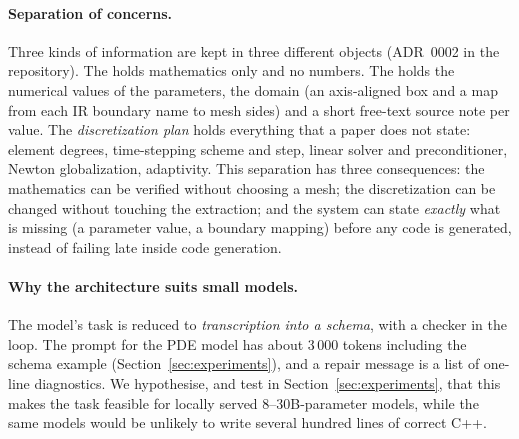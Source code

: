 \paragraph{Separation of concerns.}
Three kinds of information are kept in three different objects (ADR~0002 in the repository). The  holds mathematics only and no numbers. The  holds the numerical values of the parameters, the domain (an axis-aligned box and a map from each IR boundary name to mesh sides) and a short free-text source note per value. The \emph{discretization plan} holds everything that a paper does not state: element degrees, time-stepping scheme and step, linear solver and preconditioner, Newton globalization, adaptivity. This separation has three consequences: the mathematics can be verified without choosing a mesh; the discretization can be changed without touching the extraction; and the system can state \emph{exactly} what is missing (a parameter value, a boundary mapping) before any code is generated, instead of failing late inside code generation.

\paragraph{Why the architecture suits small models.}
The model's task is reduced to \emph{transcription into a schema}, with a checker in the loop. The prompt for the PDE model has about 3\,000 tokens including the schema example (Section~\ref{sec:experiments}), and a repair message is a list of one-line diagnostics. We hypothesise, and test in Section~\ref{sec:experiments}, that this makes the task feasible for locally served 8--30B-parameter models, while the same models would be unlikely to write several hundred lines of correct \dealii{} C++.
